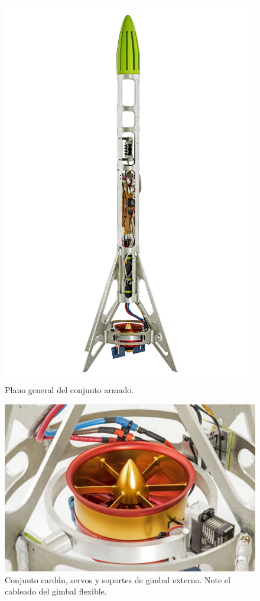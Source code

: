 \begin{figure}[htb]
    \centering
    \includegraphics[width=\linewidth]{fig/hq/wide_plane_bonete.jpg}
    \caption{Plano general del conjunto armado.}
    \label{fig:hq/wide_plane_bonete}
\end{figure}

\begin{figure}[htb]
    \centering
    \includegraphics[width=\linewidth]{fig/hq/gimbal_close.jpg}
    \caption{Conjunto cardán, servos y soportes de gimbal externo. Note el cableado del gimbal flexible.}
    \label{fig:hq/gimbal_close}
\end{figure}


